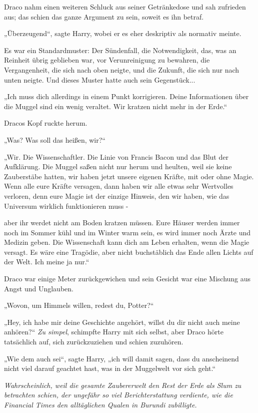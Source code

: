 {Draco nahm einen weiteren Schluck aus seiner Getränkedose und sah zufrieden aus; das schien das ganze Argument zu sein, soweit es ihn betraf.

„Überzeugend“, sagte Harry, wobei er es eher deskriptiv als normativ meinte.

Es war ein Standardmuster: Der Sündenfall, die Notwendigkeit, das, was an Reinheit übrig geblieben war, vor Verunreinigung zu bewahren, die Vergangenheit, die sich nach oben neigte, und die Zukunft, die sich nur nach unten neigte. Und dieses Muster hatte auch sein Gegenstück...

„Ich muss dich allerdings in einem Punkt korrigieren. Deine Informationen über die Muggel sind ein wenig veraltet. Wir kratzen nicht mehr in der Erde.“

Dracos Kopf ruckte herum.

„Was? Was soll das heißen, wir?“

„Wir. Die Wissenschaftler. Die Linie von Francis Bacon und das Blut der Aufklärung. Die Muggel saßen nicht nur herum und heulten, weil sie keine Zauberstäbe hatten, wir haben jetzt unsere eigenen Kräfte, mit oder ohne Magie. Wenn alle eure Kräfte versagen, dann haben wir alle etwas sehr Wertvolles verloren, denn eure Magie ist der einzige Hinweis, den wir haben, wie das Universum wirklich funktionieren muss -

aber ihr werdet nicht am Boden kratzen müssen. Eure Häuser werden immer noch im Sommer kühl und im Winter warm sein, es wird immer noch Ärzte und Medizin geben. Die Wissenschaft kann dich am Leben erhalten, wenn die Magie versagt. Es wäre eine Tragödie, aber nicht buchstäblich das Ende allen Lichts auf der Welt. Ich meine ja nur.“

Draco war einige Meter zurückgewichen und sein Gesicht war eine Mischung aus Angst und Unglauben.

„Wovon, um Himmels willen, redest du, Potter?“

„Hey, ich habe mir deine Geschichte angehört, willst du dir nicht auch meine anhören?“ \emph{Zu simpel}, schimpfte Harry mit sich selbst, aber Draco hörte tatsächlich auf, sich zurückzuziehen und schien zuzuhören.

„Wie dem auch sei“, sagte Harry, „ich will damit sagen, dass du anscheinend nicht viel darauf geachtet hast, was in der Muggelwelt vor sich geht.“

\emph{Wahrscheinlich, weil die gesamte Zaubererwelt den Rest der Erde als Slum zu betrachten schien, der ungefähr so viel Berichterstattung verdiente, wie die Financial Times den alltäglichen Qualen in Burundi zubilligte.}

}
